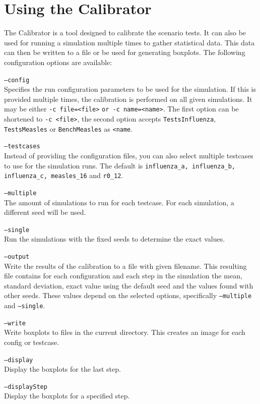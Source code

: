 \section{Using the Calibrator}
\label{sec:calibrator}

The Calibrator is a tool designed to calibrate the scenario tests.
It can also be used for running a simulation multiple times to gather statistical data.
This data can then be written to a file or be used for generating boxplots.
The following configuration options are available:

\begin{compactdesc}
    \item[\texttt{--config}] \ \\
        Specifies the run configuration parameters to be used for the simulation.
        If this is provided multiple times, the calibration is performed on all given simulations.
        It may be either \texttt{-c file=<file>} \texttt{or -c name=<name>}.
        The first option can be shortened to \texttt{-c <file>}, the second option accepts \texttt{TestsInfluenza}, \texttt{TestsMeasles} or \texttt{BenchMeasles} as  \texttt{<name}.
    \item[\texttt{--testcases}] \ \\
        Instead of providing the configuration files, you can also select multiple testcases to use for the simulation runs.
        The default is \texttt{influenza\_a, influenza\_b, influenza\_c, measles\_16} and \texttt{r0\_12}.
    \item[\texttt{--multiple}]\ \\
        The amount of simulations to run for each testcase. For each simulation, a different seed will be used.
    \item[\texttt{--single}]\ \\
        Run the simulations with the fixed seeds to determine the exact values.
    \item[\texttt{--output}]\ \\
        Write the results of the calibration to a file with given filename.
        This resulting file contains for each configuration and each step in the simulation the mean, standard deviation, exact value using the default seed and the values found with other seeds.
        These values depend on the selected options, specifically \texttt{--multiple} and \texttt{--single}.
    \item[\texttt{--write}]\ \\
        Write boxplots to files in the current directory. This creates an image for each config or testcase.
    \item[\texttt{--display}]\ \\
        Display the boxplots for the last step.
    \item[\texttt{--displayStep}]\ \\
        Display the boxplots for a specified step.
\end{compactdesc}

